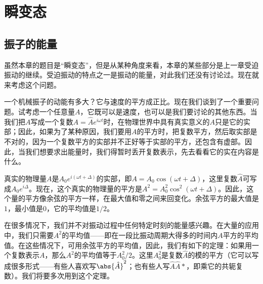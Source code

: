 \chapter{瞬变态}

\section{振子的能量}

虽然本章的题目是“瞬变态”，但是从某种角度来看，本章的某些部分是上一章受迫振动的继续。受迫振动的特点之一是振动的能量，对此我们还没有讨论过。现在就来考虑这个问题。

一个机械振子的动能有多大？它与速度的平方成正比。现在我们谈到了一个重要问题。试考虑一个任意量$A$，它既可以是速度，也可以是我们要讨论的其他东西。当我们把$A$写成一个复数$A=\hat{A}e^{i\omega t}$时，在物理世界中具有真实意义的$A$只是它的实部；因此，如果为了某种原因，我们要用$A$的平方时，把复数平方，然后取实部是不对的，因为一个复数平方的实部并不正好等于实部的平方，还包含有虚部。因此，当我们想要求出能量时，我们得暂时丢开复数表示，先去看看它的实在内容是什么。

真实的物理量$A$是$A_0e^{i(\omega t+\Delta)}$的实部，即$A=A_0\cos(\omega t+\Delta)$，这里复数$\hat{A}$可写成$A_0e^{i\Delta}$。现在，这个真实的物理量的平方是$A^2=A_0^2\cos^2(\omega t + \Delta)$。因此，这个量的平方像余弦的平方一样，在最大值和零之间来回变化。余弦平方的最大值是$1$，最小值是$0$，它的平均值是$1/2$。

在很多情况下，我们并不对振动过程中任何特定时刻的能量感兴趣。在大量的应用中，我们只需要$A^2$的平均值——即在一段比振动周期大得多的时间内$A$平方的平均值。在这些情况下，可用余弦平方的平均值，因此，我们有如下的定理：如果用一个复数表示$A$，那么$A^2$的平均值等于$A^2_0/2$。这里$A_0^2$是复数$\hat{A}$的模的平方（它可以写成很多形式——有些人喜欢写$\abs{\hat{A}}^2$；也有些人写$\hat{A}\hat{A}*$，即乘它的共轭复数）。我们将要多次用到这个定理。

